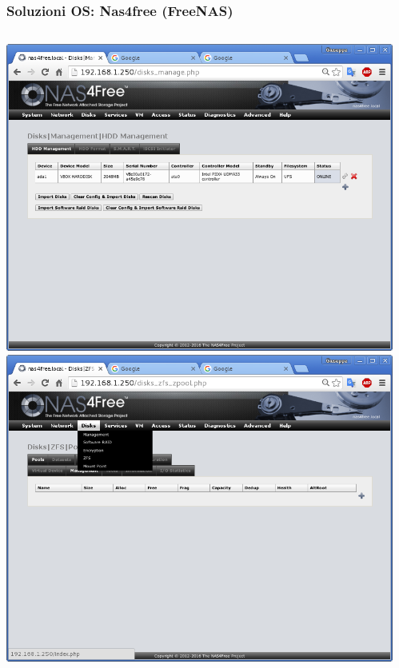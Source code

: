 \documentclass[11pt,xcolor=table]{beamer}
\begin{document}
\begin{frame}
	\frametitle{Soluzioni OS: Nas4free (FreeNAS)}
	\begin{columns}
		\begin{column}{0.48\textwidth}
			\includegraphics[width=\textwidth]{N4F/N4Fscr1.png}\\
			\vspace{3mm}
			\includegraphics[width=\textwidth]{N4F/N4Fscr2.png}\\
		\end{column}
		\begin{column}{0.48\textwidth}

\end{column}
\end{columns}
\end{frame}
\end{document}
